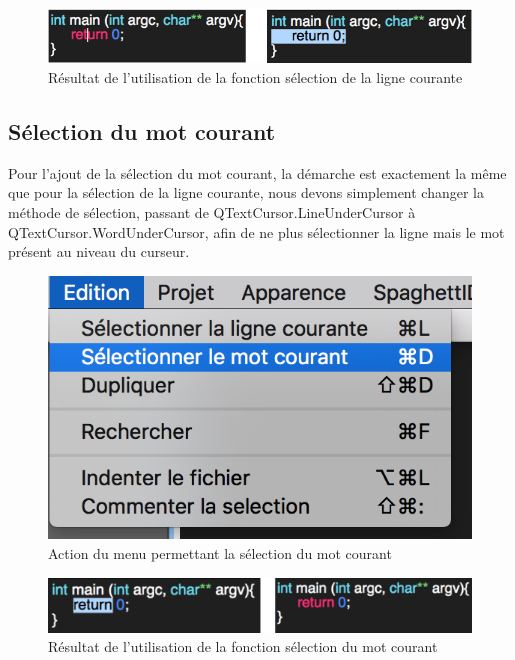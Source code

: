 \documentclass[a4paper,12pt]{article}
\begin{document}
	\begin{figure}[h!]
		\begin{center}
			\includegraphics[scale=0.8]{images/imgs_edit/resultat_selection_ligne}
			\caption{Résultat de l'utilisation de la fonction sélection de la ligne courante}
		\end{center}
	\end{figure}

	\subsection{Sélection du mot courant}

	Pour l'ajout de la sélection du mot courant, la démarche est exactement la même que pour la sélection de la ligne courante, nous devons simplement changer la méthode de sélection, passant de QTextCursor.LineUnderCursor à QTextCursor.WordUnderCursor, afin de ne plus sélectionner la ligne mais le mot présent au niveau du curseur. 

	\begin{figure}[h!]
		\begin{center}
			\includegraphics[scale=0.4]{images/imgs_edit/utilisation_selection_mot}
			\caption{Action du menu permettant la sélection du mot courant}
		\end{center}
	\end{figure}

	\begin{figure}[h!]
		\begin{center}
			\includegraphics[scale=0.8]{images/imgs_edit/resultat_selection_mot}
			\caption{Résultat de l'utilisation de la fonction sélection du mot courant}
		\end{center}
	\end{figure}
	
\end{document}
